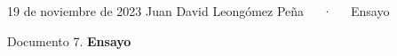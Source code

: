 \documentclass[11pt,a4paper,]{awesome-cv}
\begin{document}
\makecvheader

\makecvfooter
  {19 de noviembre de 2023}
    {Juan David Leongómez Peña~~~·~~~Ensayo}
  {\thepage}





\vspace{4mm}
\begin{tcolorbox}[enhanced,
        on line, 
        boxsep=4pt, left=0pt,right=0pt,top=0pt,bottom=0pt,
        colframe=white,colback=black]
  
\color{white}
\begin{LARGE}\begin{center}
Documento 7. \textbf{Ensayo}
\end{center}\end{LARGE}
\end{tcolorbox}

\doublespacing
\end{document}
